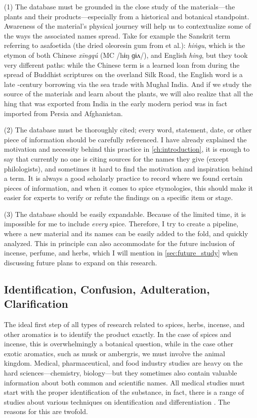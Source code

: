(1) The database must be grounded in the close study of the materials---the plants and their products---especially from a historical and botanical standpoint. Awareness of the material's physical journey will help us to contextualize some of the ways the associated names spread. Take for example the Sanskrit term referring to asafoetida (the dried oleoresin gum from  et al.):  \textit{hiṅgu}, which is the etymon of both Chinese  \textit{xīngqú} (\gls{MC} /hɨŋ ɡɨʌ/),
and English \textit{hing}, but they took very different paths: while the Chinese term is a learned loan from during the spread of Buddhist scriptures on the overland Silk Road, the English word is a late -century borrowing via the sea trade with Mughal India. And if we study the source of the materials and learn about the plants, we will also realize that all the hing that was exported from India in the early modern period was in fact imported from Persia and Afghanistan.

(2) The database must be thoroughly cited; every word, statement, date, or other piece of information should be carefully referenced. I have already explained the motivation and necessity behind this practice in \cref{ch:introduction}, it is enough to say that currently no one is citing sources for the names they give (except philologists), and sometimes it hard to find the motivation and inspiration behind a term. It is always a good scholarly practice to record where we found certain pieces of information, and when it comes to spice etymologies, this should make it easier for experts to verify or refute the findings on a specific item or stage.

(3) The database should be easily expandable. Because of the limited time, it is impossible for me to include \emph{every} spice. Therefore, I try to create a pipeline, where a new material and its names can be easily added to the fold, and quickly analyzed. This in principle can also accommodate for the future inclusion of incense, perfume, and herbs, which I will mention in \cref{sec:future_study} when discussing future plans to expand on this research.

\subsection{Identification, Confusion, Adulteration, Clarification}

The ideal first step of all types of research related to spices, herbs, incense, and other aromatics is to identify the product exactly. In the case of spices and incense, this is overwhelmingly a botanical question, while in the case other exotic aromatics, such as musk or ambergris, we must involve the animal kingdom. Medical, pharmaceutical, and food industry studies are heavy on the hard sciences---chemistry, biology---but they sometimes also contain valuable information about both common and scientific names. All medical studies must start with the proper identification of the substance, in fact, there is a range of studies about various techniques on identification and differentiation \autocite[cf.][]{ford_cinnamon_2019}. The reasons for this are twofold. 

